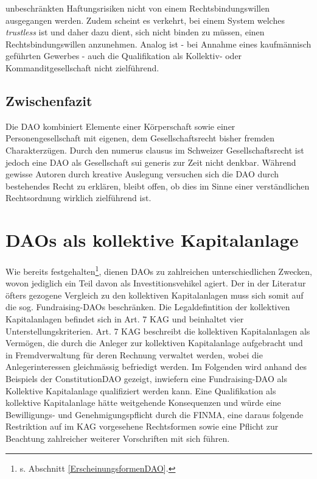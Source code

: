 \documentclass[a4paper,12pt]{report}
\begin{document}
unbeschränkten Haftungsrisiken nicht von einem Rechtsbindungswillen ausgegangen werden. Zudem scheint es verkehrt, bei einem System welches \textit{trustless} ist und daher dazu dient, sich nicht binden zu müssen, einen Rechtsbindungswillen anzunehmen. Analog ist - bei Annahme eines kaufmännisch geführten Gewerbes - auch die Qualifikation als Kollektiv- oder Kommanditgesellschaft nicht zielführend.
	
	\closesection
	\subsection{Zwischenfazit}
	\startsubsection
	Die DAO kombiniert Elemente einer Körperschaft sowie einer Personengesellschaft mit eigenen, dem Gesellschaftsrecht bisher fremden Charakterzügen. Durch den numerus clausus im Schweizer Gesellschaftsrecht ist jedoch eine DAO als Gesellschaft sui generis zur Zeit nicht denkbar. Während gewisse Autoren durch kreative Auslegung versuchen sich die DAO durch bestehendes Recht zu erklären, bleibt offen, ob dies im Sinne einer verständlichen Rechtsordnung wirklich zielführend ist. 
    \closesection
    \closesection
	
	\section{DAOs als kollektive Kapitalanlage}
	\startsection
	Wie bereits festgehalten\footnote{\space\hspace{0.5em}s. Abschnitt \ref{ErscheinungsformenDAO}.}, dienen DAOs zu zahlreichen unterschiedlichen Zwecken, wovon jediglich ein Teil davon als Investitionsvehikel agiert. Der in der Literatur öfters gezogene Vergleich zu den kollektiven Kapitalanlagen muss sich somit auf die sog. Fundraising-DAOs beschränken. Die Legaldefintition der kollektiven Kapitalanlagen befindet sich in Art. 7 KAG und beinhaltet vier Unterstellungskriterien. Art. 7 KAG beschreibt die kollektiven Kapitalanlagen als Vermögen, die durch die Anleger zur kollektiven Kapitalanlage aufgebracht und in Fremdverwaltung für deren Rechnung verwaltet werden, wobei die Anlegerinteressen gleichmässig befriedigt werden. Im Folgenden wird anhand des Beispiels der ConstitutionDAO gezeigt, inwiefern eine Fundraising-DAO als Kollektive Kapitalanlage qualifiziert werden kann. Eine Qualifikation als kollektive Kapitalanlage hätte weitgehende Konsequenzen und würde eine Bewilligungs- und Genehmigungspflicht durch die FINMA, eine daraus folgende Restriktion auf im KAG vorgesehene Rechtsformen sowie eine Pflicht zur Beachtung zahlreicher weiterer Vorschriften mit sich führen.
\end{document}
